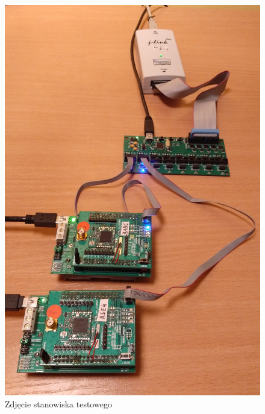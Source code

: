 \begin{figure}[H]
    \centering
    \includegraphics[width=0.75\paperwidth]{images/test_bench.jpg}
    \caption{Zdjęcie stanowiska testowego}
    \label{testbench_photo}
\end{figure}